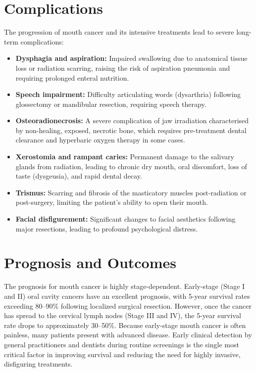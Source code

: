 \section*{Complications}
The progression of mouth cancer and its intensive treatments lead to severe long-term complications:
\begin{itemize}
    \item \textbf{Dysphagia and aspiration:} Impaired swallowing due to anatomical tissue loss or radiation scarring, raising the risk of aspiration pneumonia and requiring prolonged enteral nutrition.
    \item \textbf{Speech impairment:} Difficulty articulating words (dysarthria) following glossectomy or mandibular resection, requiring speech therapy.
    \item \textbf{Osteoradionecrosis:} A severe complication of jaw irradiation characterised by non-healing, exposed, necrotic bone, which requires pre-treatment dental clearance and hyperbaric oxygen therapy in some cases.
    \item \textbf{Xerostomia and rampant caries:} Permanent damage to the salivary glands from radiation, leading to chronic dry mouth, oral discomfort, loss of taste (dysgeusia), and rapid dental decay.
    \item \textbf{Trismus:} Scarring and fibrosis of the masticatory muscles post-radiation or post-surgery, limiting the patient's ability to open their mouth.
    \item \textbf{Facial disfigurement:} Significant changes to facial aesthetics following major resections, leading to profound psychological distress.
\end{itemize}

\section*{Prognosis and Outcomes}
The prognosis for mouth cancer is highly stage-dependent. Early-stage (Stage I and II) oral cavity cancers have an excellent prognosis, with 5-year survival rates exceeding 80--90\% following localized surgical resection. However, once the cancer has spread to the cervical lymph nodes (Stage III and IV), the 5-year survival rate drops to approximately 30--50\%. Because early-stage mouth cancer is often painless, many patients present with advanced disease. Early clinical detection by general practitioners and dentists during routine screenings is the single most critical factor in improving survival and reducing the need for highly invasive, disfiguring treatments.

